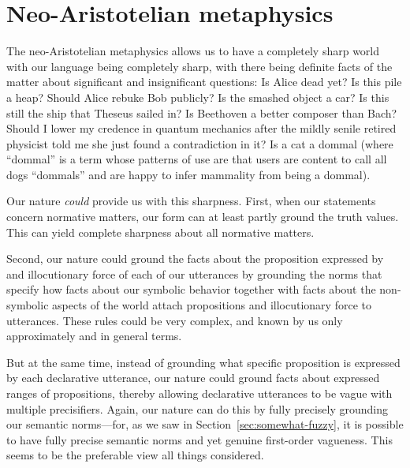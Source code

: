 \section{Neo-Aristotelian metaphysics}
The neo-Aristotelian metaphysics allows us to have a completely sharp world with our language being completely sharp, with there being
definite facts of the matter about significant and insignificant
questions: Is Alice dead yet? Is this pile a heap? Should Alice rebuke Bob publicly? Is the smashed object a car?
Is this still the ship that Theseus sailed in? Is Beethoven a better composer than Bach? Should I lower my credence in quantum
mechanics after the mildly senile retired physicist told me she just found a contradiction in it? Is a cat a dommal (where ``dommal''
is a term whose patterns of use are that users are content to call all dogs ``dommals'' and are happy to infer mammality from being
a dommal). 

Our nature \textit{could} provide us with this sharpness. First, when our statements concern normative matters, our 
form can at least partly ground the truth values. This can yield complete sharpness about all normative matters.

Second, our nature could ground the facts about the proposition expressed by and illocutionary force of each of our utterances 
by grounding the norms that specify how facts about our symbolic behavior together with facts about the non-symbolic aspects of the world attach 
propositions and illocutionary force to utterances. These rules could be very complex, and known by us only approximately and in general
terms. 

But at the same time, instead of grounding what specific proposition is expressed by each declarative utterance, our nature could 
ground facts about expressed ranges of propositions, thereby allowing declarative utterances to be vague with multiple precisifiers. Again, our nature 
can do this by fully precisely grounding our semantic norms---for, as we saw in Section~\ref{sec:somewhat-fuzzy}, it is possible to have fully precise
semantic norms and yet genuine first-order vagueness. This seems to be the preferable view all things considered.

